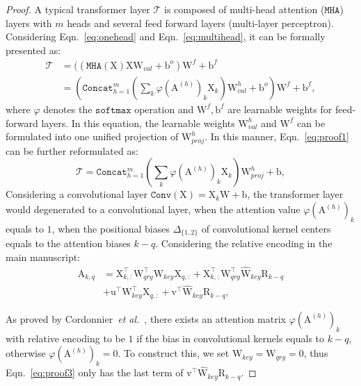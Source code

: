 \documentclass[journal]{IEEEtran}
\def\etal{{\em et al.}}
\newcommand{\mc}[1]{\mathcal{#1}}
\newcommand{\br}[1]{\bm{\mathrm{#1}}}
\newcommand{\bs}[1]{\boldsymbol{\texttt{#1}}}
\newtheorem{proof}{Proof}[section]
\begin{document}
\begin{proof}
A typical transformer layer $\mc{T}$ is composed of multi-head attention ($\bs{MHA}$) layers with $m$ heads and several feed forward layers (multi-layer perceptron). Considering Eqn.~\eqref{eq:onehead} and Eqn.~\eqref{eq:multihead}, it can be formally presented as:
\begin{equation}\label{eq:proof1}
\begin{split}
\mc{T} &= ((\bs{MHA}(\br{X})\br{X} \br{W}_{val}+\br{b}^{o})\br{W}^{f}+\br{b}^{f} \\
&=(\bs{Concat}_{h=1}^{m} (\sum_{k} \varphi (\br{A}^{(h)})_{k} \br{X}_{k}) \br{W}^{h}_{val}+\br{b}^{o})\br{W}^{f}+\br{b}^{f},
\end{split}
\end{equation}
where $\varphi$ denotes the $\bs{softmax}$ operation and $\br{W}^{f},\br{b}^{f}$ are learnable weights for feed-forward layers. In this equation, the learnable weights $\br{W}^{h}_{val}$ and $\br{W}^{f}$ can be formulated into one unified projection of $\br{W}^{h}_{proj}$.
In this manner, Eqn.~\eqref{eq:proof1} can be further reformulated as:
\begin{equation}\label{eq:proof2}
\mc{T} =\bs{Concat}_{h=1}^{m} (\sum_{k} \varphi (\br{A}^{(h)})_{k} \br{X}_{k}) \br{W}^{h}_{proj}+\br{b},
\end{equation}
Considering a convolutional layer $\bs{Conv}(\br{X})=\br{X}_{k} \br{W}+\br{b}$, the transformer layer would degenerated to a convolutional layer, when the attention value $ \varphi (\br{A}^{(h)})_{k} $ equals to $1$, when the positional biases $\Delta_{\{1,2\}}$ of convolutional kernel centers equals to the attention biases $k-q$. Considering the relative encoding in the main manuscript:
\begin{equation}\label{eq:proof3}
\begin{split}
\br{A}_{k,q}&= \br{X}_{k,:}^{\top} \br{W}_{qry}^{\top} \br{W}_{key}\br{X}_{q,:}+ \br{X}_{k,:}^{\top}\br{W}_{qry}^{\top} \widehat{\br{W}}_{key}\br{R}_{k-q}\\
& + \br{u}^{\top}\br{W}_{key}^{\top}\br{X}_{q,:}+ \br{v}^{\top}\widehat{\br{W}}_{key}\br{R}_{k-q},
\end{split}
\end{equation}

As proved by Cordonnier~\etal~\cite{cordonnier2020relationship}, there exists an attention matrix $ \varphi (\br{A}^{(h)})_{k} $ with relative encoding to be $1$ if the bias in convolutional kernels equals to $k-q$, otherwise $ \varphi (\br{A}^{(h)})_{k} =0$. To construct this, we set $\br{W}_{key} = \br{W}_{qry} = 0$, thus Eqn.~\eqref{eq:proof3} only has the last term of $\br{v}^{\top}\widehat{\br{W}}_{key}\br{R}_{k-q}$.


\end{proof}
\end{document}
